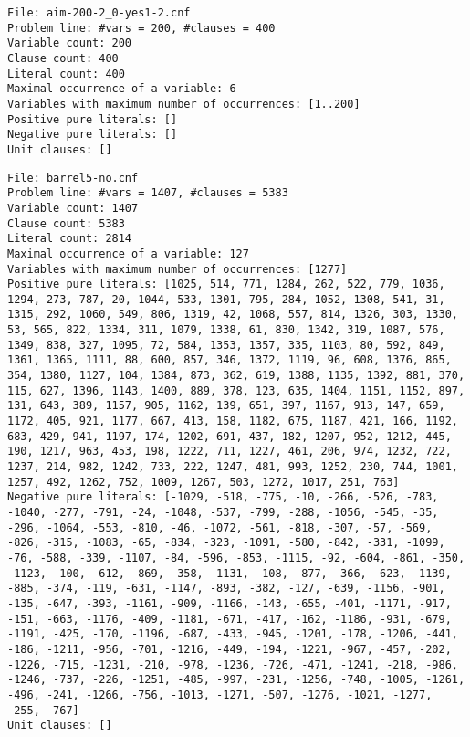 \documentclass[a4paper,10pt]{article}
\begin{document}
\begin{lstlisting}
File: aim-200-2_0-yes1-2.cnf
Problem line: #vars = 200, #clauses = 400
Variable count: 200
Clause count: 400
Literal count: 400
Maximal occurrence of a variable: 6
Variables with maximum number of occurrences: [1..200]
Positive pure literals: []
Negative pure literals: []
Unit clauses: []
\end{lstlisting}
\begin{lstlisting}
File: barrel5-no.cnf
Problem line: #vars = 1407, #clauses = 5383
Variable count: 1407
Clause count: 5383
Literal count: 2814
Maximal occurrence of a variable: 127
Variables with maximum number of occurrences: [1277]
Positive pure literals: [1025, 514, 771, 1284, 262, 522, 779, 1036, 1294, 273, 787, 20, 1044, 533, 1301, 795, 284, 1052, 1308, 541, 31, 1315, 292, 1060, 549, 806, 1319, 42, 1068, 557, 814, 1326, 303, 1330, 53, 565, 822, 1334, 311, 1079, 1338, 61, 830, 1342, 319, 1087, 576, 1349, 838, 327, 1095, 72, 584, 1353, 1357, 335, 1103, 80, 592, 849, 1361, 1365, 1111, 88, 600, 857, 346, 1372, 1119, 96, 608, 1376, 865, 354, 1380, 1127, 104, 1384, 873, 362, 619, 1388, 1135, 1392, 881, 370, 115, 627, 1396, 1143, 1400, 889, 378, 123, 635, 1404, 1151, 1152, 897, 131, 643, 389, 1157, 905, 1162, 139, 651, 397, 1167, 913, 147, 659, 1172, 405, 921, 1177, 667, 413, 158, 1182, 675, 1187, 421, 166, 1192, 683, 429, 941, 1197, 174, 1202, 691, 437, 182, 1207, 952, 1212, 445, 190, 1217, 963, 453, 198, 1222, 711, 1227, 461, 206, 974, 1232, 722, 1237, 214, 982, 1242, 733, 222, 1247, 481, 993, 1252, 230, 744, 1001, 1257, 492, 1262, 752, 1009, 1267, 503, 1272, 1017, 251, 763]
Negative pure literals: [-1029, -518, -775, -10, -266, -526, -783, -1040, -277, -791, -24, -1048, -537, -799, -288, -1056, -545, -35, -296, -1064, -553, -810, -46, -1072, -561, -818, -307, -57, -569, -826, -315, -1083, -65, -834, -323, -1091, -580, -842, -331, -1099, -76, -588, -339, -1107, -84, -596, -853, -1115, -92, -604, -861, -350, -1123, -100, -612, -869, -358, -1131, -108, -877, -366, -623, -1139, -885, -374, -119, -631, -1147, -893, -382, -127, -639, -1156, -901, -135, -647, -393, -1161, -909, -1166, -143, -655, -401, -1171, -917, -151, -663, -1176, -409, -1181, -671, -417, -162, -1186, -931, -679, -1191, -425, -170, -1196, -687, -433, -945, -1201, -178, -1206, -441, -186, -1211, -956, -701, -1216, -449, -194, -1221, -967, -457, -202, -1226, -715, -1231, -210, -978, -1236, -726, -471, -1241, -218, -986, -1246, -737, -226, -1251, -485, -997, -231, -1256, -748, -1005, -1261, -496, -241, -1266, -756, -1013, -1271, -507, -1276, -1021, -1277, -255, -767]
Unit clauses: []
\end{lstlisting}
\end{document}
